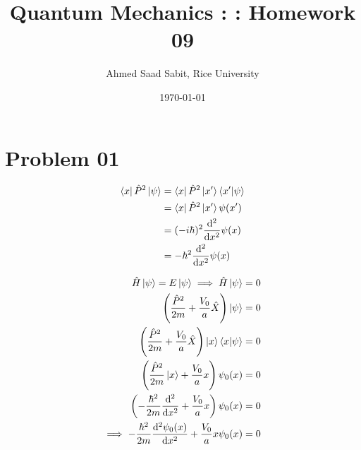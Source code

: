\documentclass[letter, 10pts]{article}
\title{Quantum Mechanics : : Homework 09}
\author{Ahmed Saad Sabit, Rice University}
\date{\today}
\newcommand{\hb}{\hbar}
\begin{document}
\maketitle

\section*{Problem 01}
\begin{minipage}{0.5\textwidth}
\begin{align*}
	\bra{x}	\hat{P}^2 \ket{\psi} &= 
	\bra{x} \hat{P}^2 \ket{x'} \braket{x'|\psi} \\
	&=  
	\bra{x} \hat{P}^2 \ket{x'} \psi(x') \\
	&= (-i \hb)^2 \frac{\mathrm{d} ^2}{\mathrm{d} x^2} \psi(x) \\
	&= - \hb^2 \frac{\mathrm{d} ^2}{\mathrm{d} x^2} \psi(x) 
\end{align*}
\end{minipage}\hfill\begin{minipage}{0.5\textwidth}
\begin{align*}
	\hat{H} \ket{\psi} = E \ket{\psi} \implies \hat{H} \ket{\psi} &= 0 \\ 
	\left(\frac{\hat{P}^2}{2m} + \frac{V_0}{a} \hat{X}\right) \ket{\psi} &= 0\\
\left(\frac{\hat{P}^2}{2m} + \frac{V_0}{a} \hat{X}\right) \ket{x} \braket{x|\psi} &= 0\\
\left(\frac{\hat{P}^2}{2m} \ket{x}+ \frac{V_0}{a} x \right) \psi_0(x) &= 0\\
\left(-\frac{\hb ^2}{2m} \frac{\mathrm{d} ^2}{\mathrm{d} x^2}  + \frac{V_0}{a} x \right) \psi_0(x) &= 0\\ \implies
-\frac{\hb ^2}{2m} \frac{\mathrm{d} ^2 \psi_0(x)}{\mathrm{d} x^2}  + \frac{V_0}{a} x \psi_0(x) &= 0\\
\end{align*}
\end{minipage} 
\end{document}
